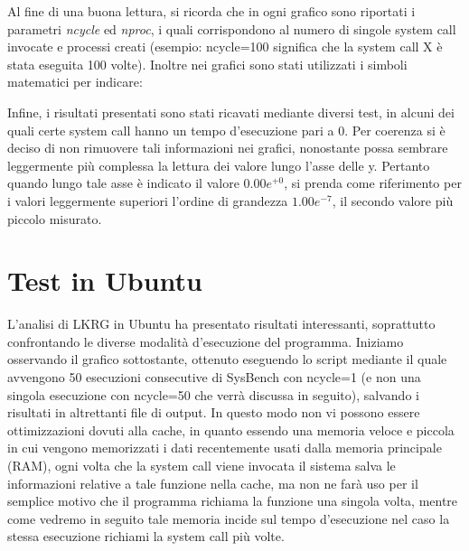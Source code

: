 Al fine di una buona lettura, si ricorda che in ogni grafico sono riportati i parametri \emph{ncycle} ed \emph{nproc}, i quali corrispondono al numero di singole system call invocate e processi creati (esempio: ncycle=100 significa che la system call X è stata eseguita 100 volte). Inoltre nei grafici sono stati utilizzati i simboli matematici per indicare:


Infine, i risultati presentati sono stati ricavati mediante diversi test, in alcuni dei quali certe system call hanno un tempo d'esecuzione pari a 0. Per coerenza si è deciso di non rimuovere tali informazioni nei grafici, nonostante possa sembrare leggermente più complessa la lettura dei valore lungo l'asse delle y. Pertanto quando lungo tale asse è indicato il valore $0.00e^{+0}$, si prenda come riferimento per i valori leggermente superiori l'ordine di grandezza $1.00e^{-7}$, il secondo valore più piccolo misurato.

\section{Test in Ubuntu}

L'analisi di LKRG in Ubuntu ha presentato risultati interessanti, soprattutto confrontando le diverse modalità d'esecuzione del programma. Iniziamo osservando il grafico sottostante, ottenuto eseguendo lo script mediante il quale avvengono 50 esecuzioni consecutive di SysBench con ncycle=1 (e non una singola esecuzione con ncycle=50 che verrà discussa in seguito), salvando i risultati in altrettanti file di output. In questo modo non vi possono essere ottimizzazioni dovuti alla cache, in quanto essendo una memoria veloce e piccola in cui vengono memorizzati i dati recentemente usati dalla memoria principale (RAM), ogni volta che la system call viene invocata il sistema salva le informazioni relative a tale funzione nella cache, ma non ne farà uso per il semplice motivo che il programma richiama la funzione una singola volta, mentre come vedremo in seguito tale memoria incide sul tempo d'esecuzione nel caso la stessa esecuzione richiami la system call più volte.

